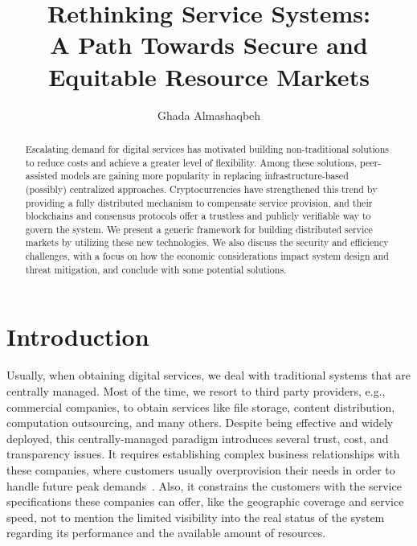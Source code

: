 \documentclass{llncs}
\begin{document}
%
\title{\Large \bf Rethinking Service Systems: \\
A Path Towards Secure and Equitable Resource Markets
}


\author{Ghada Almashaqbeh} 
%
%

\maketitle


\begin{abstract}
Escalating demand for digital services has motivated building non-traditional solutions to reduce costs and achieve a greater level of flexibility.
Among these solutions, peer-assisted models are gaining more popularity in replacing infrastructure-based (possibly) centralized approaches.
 Cryptocurrencies have strengthened this trend by providing a fully distributed mechanism to compensate service provision, and their blockchains and consensus protocols offer a trustless and publicly verifiable way to govern the system.
 We present a generic framework for building distributed service markets by utilizing these new technologies.
 We also discuss the security and efficiency challenges, with a focus on how the economic considerations impact system design and threat mitigation, and conclude with some potential solutions.
\end{abstract}


\section{Introduction}
Usually, when obtaining digital services, we deal with traditional systems that are centrally managed. Most of the time, we resort to third party providers, e.g., commercial companies,  to obtain services like file storage, content distribution, computation outsourcing, and many others. Despite being effective and widely deployed, this centrally-managed paradigm introduces several trust, cost, and transparency issues. It requires establishing complex business relationships with these companies, where customers usually overprovision their needs in order to handle future peak demands~\cite{Kassa13,Nicolae14}. Also, it constrains the customers with the service specifications these companies can offer, like the geographic coverage and service speed, not to mention the limited visibility into the real status of the system regarding its performance and the available amount of resources.
\end{document}
